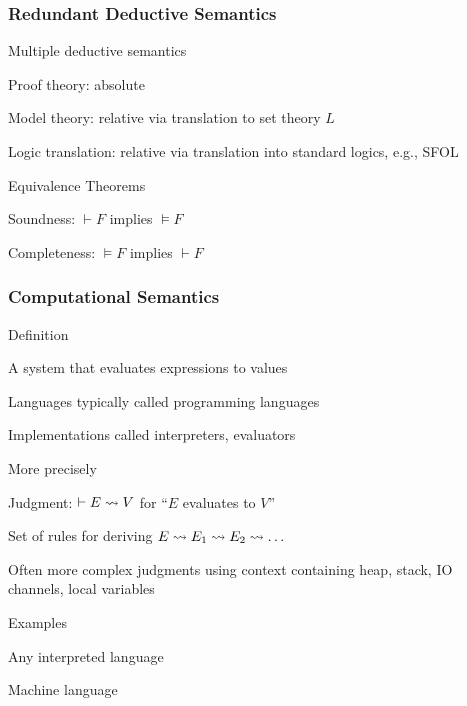 \begin{frame}\frametitle{Redundant Deductive Semantics}
\begin{blockitems}{Multiple deductive semantics}
\item Proof theory: absolute
\item Model theory: relative via translation to set theory $L$
\item Logic translation: relative via translation into standard logics, e.g., SFOL
\end{blockitems}

\begin{blockitems}{Equivalence Theorems}
\item Soundness: $\vdash F$ implies $\models F$
\item Completeness: $\models F$ implies $\vdash F$
\end{blockitems}
\end{frame}

\begin{frame}\frametitle{Computational Semantics}
\begin{blockitems}{Definition}
\item A system that evaluates expressions to values
\item Languages typically called programming languages
\item Implementations called interpreters, evaluators
\end{blockitems}

\begin{blockitems}{More precisely}
\item Judgment: $\vdash E\rightsquigarrow V$ for ``$E$ evaluates to $V$''
\item Set of rules for deriving $E\rightsquigarrow E_1\rightsquigarrow E_2\rightsquigarrow \ldots$
\item Often more complex judgments using context containing heap, stack, IO channels, local variables
\end{blockitems}

\begin{blockitems}{Examples}
\item Any interpreted language 
\item Machine language 
\end{blockitems}
\end{frame}

